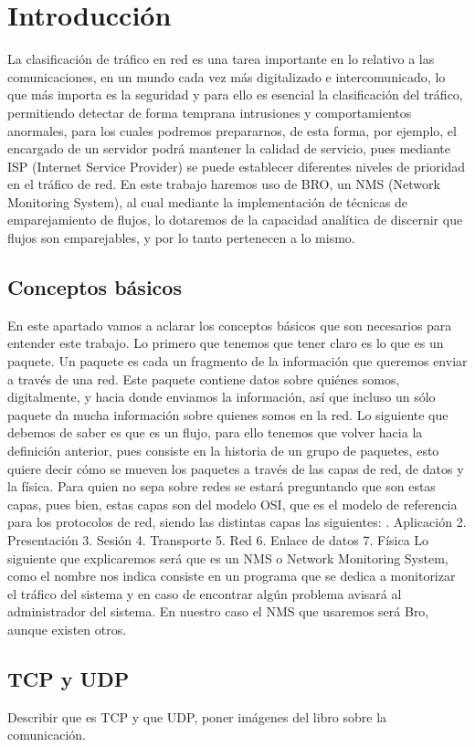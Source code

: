 \chapter{Introducción}

La clasificación de tráfico en red es una tarea importante 
en lo relativo a las comunicaciones, en un mundo cada vez 
más digitalizado e intercomunicado, lo que más importa es 
la seguridad y para ello es esencial la clasificación del 
tráfico, permitiendo detectar de forma temprana intrusiones 
y comportamientos anormales, para los cuales podremos 
prepararnos, de esta forma, por ejemplo, el encargado de un 
servidor podrá mantener la calidad de servicio, pues mediante 
ISP (Internet Service Provider) se puede establecer diferentes 
niveles de prioridad en el tráfico de red.
\intro
En este trabajo haremos uso de BRO, un NMS (Network Monitoring System), 
al cual mediante la implementación de técnicas de emparejamiento de 
flujos, lo dotaremos de la capacidad analítica de discernir que flujos 
son emparejables, y por lo tanto pertenecen a lo mismo.

\section{Conceptos básicos}

En este apartado vamos a aclarar los conceptos básicos que son necesarios 
para entender este trabajo.
\intro
Lo primero que tenemos que tener claro es lo que es un paquete. Un paquete 
es cada un fragmento de la información que queremos enviar a través de una red. 
Este paquete contiene datos sobre quiénes somos, digitalmente, y hacia donde 
enviamos la información, así que incluso un sólo paquete da mucha información 
sobre quienes somos en la red.
\intro
Lo siguiente que debemos de saber es que es un flujo, para ello tenemos que 
volver hacia la definición anterior, pues consiste en la historia de un grupo 
de paquetes, esto quiere decir cómo se mueven los paquetes a través de las capas 
de red, de datos y la física. Para quien no sepa sobre redes se estará 
preguntando que son estas capas, pues bien, estas capas son del modelo OSI, que 
es el modelo de referencia para los protocolos de red, siendo las distintas 
capas las siguientes:
. Aplicación
2. Presentación
3. Sesión
4. Transporte
5. Red
6. Enlace de datos
7. Física
\intro
Lo siguiente que explicaremos será que es un NMS o Network Monitoring System, 
como el nombre nos indica consiste en un programa que se dedica a monitorizar 
el tráfico del sistema y en caso de encontrar algún problema avisará al 
administrador del sistema. En nuestro caso el NMS que usaremos será Bro, 
aunque existen otros.

\section{TCP y UDP}

Describir que es TCP y que UDP, poner imágenes del libro sobre la comunicación.